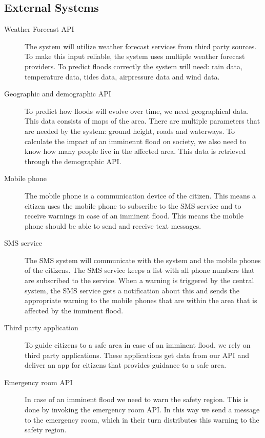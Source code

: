 \subsection{External Systems}
\begin{description}
	\item[Weather Forecast API] The system will utilize weather forecast services from third party sources. To make this input reliable, the system uses multiple weather forecast providers. To predict floods correctly the system will need: rain data, temperature data, tides data, airpressure data and wind data.
	\item[Geographic and demographic API] To predict how floods will evolve over time, we need geographical data. This data consists of maps of the area. There are multiple parameters that are needed by the system: ground height, roads and waterways. To calculate the impact of an imminennt flood on society, we also need to know how many people live in the affected area. This data is retrieved through the demographic API.
	\item[Mobile phone] The mobile phone is a communication device of the citizen. This means a citizen uses the mobile phone to subscribe to the SMS service and to receive warnings in case of an imminent flood. This means the mobile phone should be able to send and receive text messages.
	\item[SMS service] The SMS system will communicate with the system and the mobile phones of the citizens. The SMS service keeps a list with all phone numbers that are subscribed to the service. When a warning is triggered by the central system, the SMS service gets a notification about this and sends the appropriate warning to the mobile phones that are within the area that is affected by the imminent flood.
	\item[Third party application] To guide citizens to a safe area in case of an imminent flood, we rely on third party applications. These applications get data from our API and deliver an app for citizens that provides guidance to a safe area.
	\item[Emergency room API] In case of an imminent flood we need to warn the safety region. This is done by invoking the emergency room API. In this way we send a message to the emergency room, which in their turn distributes this warning to the safety region.
\end{description}

